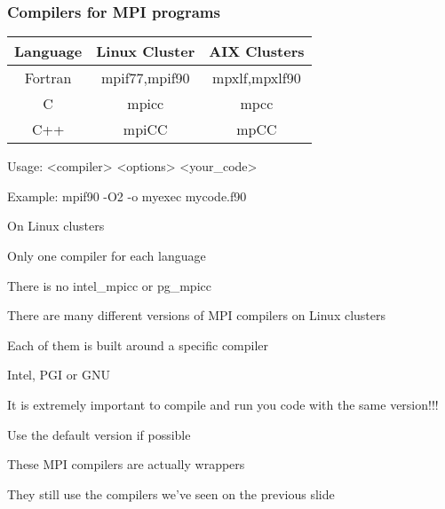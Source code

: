 \documentclass[slidestop,mathserif,compress,xcolor=svgnames,table]{beamer}
\newcommand*\vardiamond{\textcolor{tigerspurple}{%
  \ensuremath{\blacklozenge}}}
\newenvironment{bblock}[0]
{
\begin{beamerboxesrounded}[upper=uppercol1,lower=lowercol1,shadow=true]}
{\end{beamerboxesrounded}}
\begin{document}
\begin{frame}
\frametitle{\small Compilers for MPI programs}
\begin{bblock}{}
\begin{center}
\begin{tabular}{|c|c|c|}
\hline
Language & {Linux Cluster} & AIX Clusters\\
\hline
Fortran & mpif77,mpif90 & mpxlf,mpxlf90\\\hline
C & mpicc & mpcc\\\hline
C++ & mpiCC & mpCC\\
\hline
\end{tabular}
\end{center}
\end{bblock}
\begin{itemize}
  \item Usage: <compiler> <options> <your\_code>
  \begin{enumerate}
    {\scriptsize
    \item[$\vardiamond$] Example: mpif90 -O2 -o myexec mycode.f90
    }
  \end{enumerate}
  \item On Linux clusters
  \begin{enumerate}
    {\scriptsize
    \item[$\vardiamond$] Only one compiler for each language
    \item[$\vardiamond$] There is no intel\_mpicc or pg\_mpicc
    }
  \end{enumerate}
  \item There are many different versions of MPI compilers on Linux clusters
  \begin{enumerate}
    {\scriptsize
    \item[$\vardiamond$]  Each of them is built around a specific compiler
    \item[$\vardiamond$]  Intel, PGI or GNU
    }
  \end{enumerate}
  \item It is extremely important to compile and run you code with the same version!!!
  \item Use the default version if possible
  \item These MPI compilers are actually wrappers
  \begin{enumerate}
    {\scriptsize
    \item[$\vardiamond$]  They still use the compilers we've seen on the previous slide
    \begin{enumerate}

\end{enumerate}}
\end{enumerate}
\end{itemize}
\end{frame}
\end{document}
